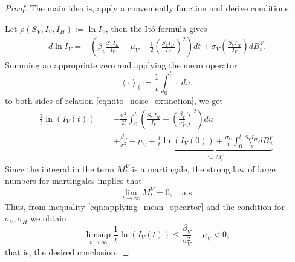 \begin{proof}
    The main idea is, apply a conveniently function and derive conditions. 
    
    Let $\rho (S_V, I_V, I_H):= \ln I_V$, then the It\^{o} formula 
    gives
    \begin{equation} \label{eqn:ito_noise_extinction}
        \begin{aligned}
            d \ln I_V = & 
                \left(
                    \beta_v \frac{S_V I_H}{ I_V} - \mu_V
                    - \frac{1}{2}
                    \left(
                        \frac{S_V I_H}{I_V}
                    \right) ^ 2
                \right) dt
                 + \sigma_V 
                \left(
                    \frac{S_V I_H}{ I_V}
                \right) dB_t ^ V.
        \end{aligned}
    \end{equation}
    Summing an appropriate zero and applying the mean operator
    $$
        \left < \cdot \right >_t
        := 
            \frac{1}{t}
            \int_{0} ^ t
                \cdot \ du,
    $$
    to both sides of relation \eqref{eqn:ito_noise_extinction}, we get
    \begin{equation} \label{eqn:applying_mean_opeartor}
        \begin{aligned}
            \frac{1}{t} \ln(I_V(t))
            =&
            - 
            \frac{\sigma_V ^ 2}{2t}
            \int_{0} ^ {t}
                \left(
                    \frac{S_V I_H}{I_V} 
                    -
                    \left(
                        \frac{\beta_V}{\sigma_V ^ 2}
                    \right) ^ 2
                \right)
            du
            \\
            & + 
            \frac{\beta_V}{\sigma_V ^ 2}
            - 
            \mu_V 
            + 
            \underbrace{
                \frac{1}{t} \ln(I_V(0))
                +
                \frac{\sigma_V}{t}
                \int_{0}^t
                    \frac{S_V I_H}{I_V}
                    dB_u^V
            }_{:=M_t^V} .                  
        \end{aligned}
    \end{equation}
%
    Since the integral in the term $M_t^V$ is a martingale, 
    the strong law of large numbers for martingales 
    \citet[p. 12,][]{Mao2007} implies that
    $$
        \lim_{t \to \infty} M_t^V = 0, \quad \text{a.s.}
    $$
    Thus, from inequality \eqref{eqn:applying_mean_opeartor} 
    and the condition for $\sigma_V, \sigma_H$
    we obtain
    \begin{equation}\label{eqn:bound_vector_noise}
        \limsup_{t \to \infty} 
            \frac{1}{t}
            \ln(I_V(t)) 
            \leq
            \frac{\beta_V}{\sigma_V^2} - \mu_V < 0,           
    \end{equation}
    that is, the desired conclusion.
\end{proof}
%
%
%

